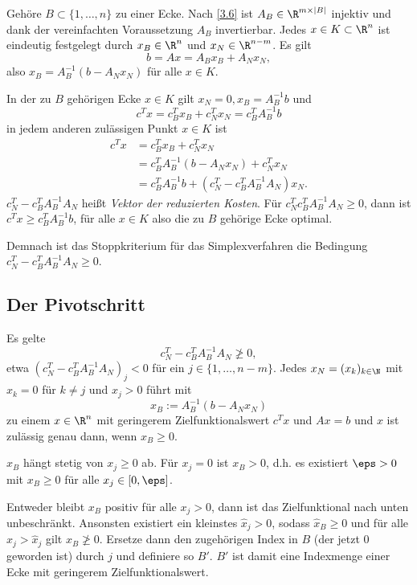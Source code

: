 Gehöre $B \subset \{1, \dotsc, n\}$ zu einer Ecke.
Nach \ref{3.6} ist $A_B \in \R^{m\times |B|}$ injektiv und dank der vereinfachten Voraussetzung $A_B$ invertierbar.
Jedes $x \in K \subset \R^n$ ist eindeutig festgelegt durch $x_B \in \R^n$ und $x_N \in \R^{n-m}$.
Es gilt
\[
	b = Ax = A_Bx_B + A_Nx_N,
\]
also $x_B = A_B^{-1} (b - A_N x_N)$ für alle $x \in K$.

In der zu $B$ gehörigen Ecke $x \in K$ gilt $x_N = 0, x_B = A_B^{-1}b$ und
\[
	c^T x = c_B^T x_B + c_N^T x_N = c_B^T A_B^{-1}b
\]
in jedem anderen zulässigen Punkt $x \in K$ ist
\begin{align*}
	c^Tx
	&= c_B^T x_B + c_N^T x_N \\
	&= c_B^T A_B^{-1}(b - A_Nx_N) + c_N^T x_N \\
	&= c_B^T A_B^{-1}b + (c_N^T - c_B^T A_B^{-1}A_N) x_N.
\end{align*}
$c_N^T - c_B^T A_B^{-1} A_N$ heißt \emph{Vektor der reduzierten Kosten}.
Für $c_N^T c_B^T A_B^{-1} A_N \ge 0$, dann ist $c^T x \ge c_B^T A_B^{-1} b$, für alle $x \in K$ also die zu $B$ gehörige Ecke optimal.

Demnach ist das Stoppkriterium für das Simplexverfahren die Bedingung $c_N^T - c_B^T A_B^{-1} A_N \ge 0$.

\subsection{Der Pivotschritt}

Es gelte
\[
	c_N^T - c_B^T A_B^{-1} A_N \not\ge 0,
\]
etwa $(c_N^T - c_B^T A_B^{-1} A_N)_j < 0$ für ein $j \in \{1, \dotsc, n-m\}$.
Jedes $x_N = (x_k)_{k\in\N}$ mit $x_k = 0$ für $k \neq j$ und $x_j > 0$ führt mit
\[
	x_B := A_B^{-1}(b - A_N x_N)
\]
zu einem $x \in \R^n$ mit geringerem Zielfunktionalswert $c^T x$ und $Ax = b$ und $x$ ist zulässig genau dann, wenn $x_B \ge 0$.

$x_B$ hängt stetig von $x_j \ge 0$ ab.
Für $x_j = 0$ ist $x_B > 0$, d.h. es existiert $\eps > 0$ mit $x_B \ge 0$ für alle $x_j \in [0, \eps]$.

Entweder bleibt $x_B$ positiv für alle $x_j > 0$, dann ist das Zielfunktional nach unten unbeschränkt.
Ansonsten existiert ein kleinstes $\hat x_j > 0$, sodass $\hat x_B \ge 0$ und für alle $x_j > \hat x_j$ gilt $x_B \not\ge 0$.
Ersetze dann den zugehörigen Index in $B$ (der jetzt 0 geworden ist) durch $j$ und definiere so $B'$.
$B'$ ist damit eine Indexmenge einer Ecke mit geringerem Zielfunktionalswert.



